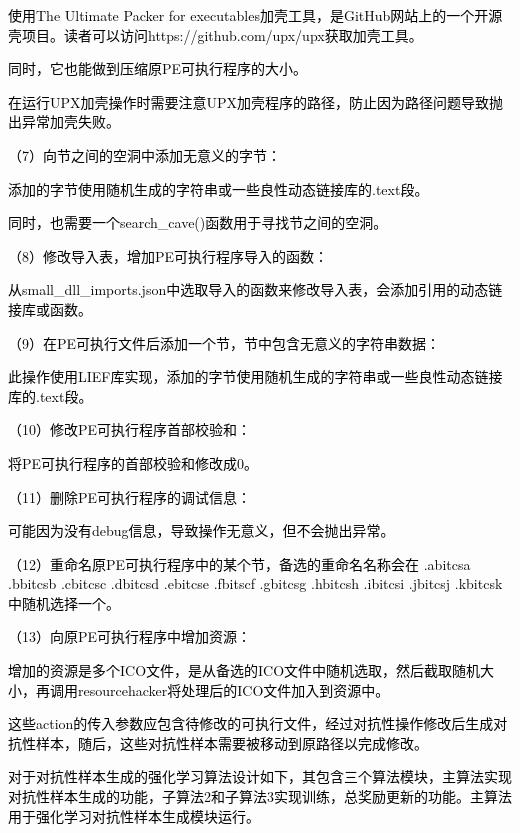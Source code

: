 \textcolor{black}{使用The Ultimate Packer for executables加壳工具，是GitHub网站上的一个开源壳项目。读者可以访问https://github.com/upx/upx获取加壳工具。}

\textcolor{black}{同时，它也能做到压缩原PE可执行程序的大小。}

\textcolor{black}{在运行UPX加壳操作时需要注意UPX加壳程序的路径，防止因为路径问题导致抛出异常加壳失败。}

\textcolor{black}{（7）向节之间的空洞中添加无意义的字节：}

\textcolor{black}{添加的字节使用随机生成的字符串或一些良性动态链接库的.text段。}

\textcolor{black}{同时，也需要一个search\_cave()函数用于寻找节之间的空洞。}

\textcolor{black}{（8）修改导入表，增加PE可执行程序导入的函数：}

\textcolor{black}{从small\_dll\_imports.json中选取导入的函数来修改导入表，会添加引用的动态链接库或函数。}

\textcolor{black}{（9）在PE可执行文件后添加一个节，节中包含无意义的字符串数据：}

\textcolor{black}{此操作使用LIEF库实现，添加的字节使用随机生成的字符串或一些良性动态链接库的.text段。}

\textcolor{black}{（10）修改PE可执行程序首部校验和：}

\textcolor{black}{将PE可执行程序的首部校验和修改成0。}

\textcolor{black}{（11）删除PE可执行程序的调试信息：}

\textcolor{black}{可能因为没有debug信息，导致操作无意义，但不会抛出异常。}

\textcolor{black}{（12）重命名原PE可执行程序中的某个节，备选的重命名名称会在
.abitcsa .bbitcsb .cbitcsc .dbitcsd .ebitcse .fbitscf .gbitcsg .hbitcsh .ibitcsi .jbitcsj .kbitcsk中随机选择一个。
}

\textcolor{black}{（13）向原PE可执行程序中增加资源：}

\textcolor{black}{增加的资源是多个ICO文件，是从备选的ICO文件中随机选取，然后截取随机大小，再调用resourcehacker将处理后的ICO文件加入到资源中。}

\textcolor{black}{这些action的传入参数应包含待修改的可执行文件，经过对抗性操作修改后生成对抗性样本，随后，这些对抗性样本需要被移动到原路径以完成修改。}

\textcolor{black}{对于对抗性样本生成的强化学习算法设计如下，其包含三个算法模块，主算法实现对抗性样本生成的功能，子算法2和子算法3实现训练，总奖励更新的功能。主算法用于强化学习对抗性样本生成模块运行。}

